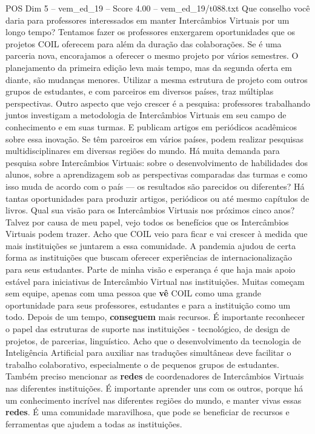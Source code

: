 \begin{textsample}{POS Dim 5 – vem\_ed\_19 – Score 4.00 – vem\_ed\_19/t088.txt}  \label{ex:f5_pos_131}
Que conselho você daria para professores interessados em manter Intercâmbios Virtuais por um longo tempo?
Tentamos fazer os professores enxergarem oportunidades que os projetos COIL oferecem para além da duração das colaborações.
Se é uma parceria nova, encorajamos a oferecer o mesmo projeto por vários semestres.
O planejamento da primeira edição leva mais tempo, mas da segunda oferta em diante, são mudanças menores.
Utilizar a mesma estrutura de projeto com outros grupos de estudantes, e com parceiros em diversos países, traz múltiplas perspectivas.
Outro aspecto que vejo crescer é a pesquisa: professores trabalhando juntos investigam a metodologia de Intercâmbios Virtuais em seu campo de conhecimento e em suas turmas.
E publicam artigos em periódicos acadêmicos sobre essa inovação.
Se têm parceiros em vários países, podem realizar pesquisas multidisciplinares em diversas regiões do mundo.
Há muita demanda para pesquisa sobre Intercâmbios Virtuais: sobre o desenvolvimento de habilidades dos alunos, sobre a aprendizagem sob as perspectivas comparadas das turmas e como isso muda de acordo com o país — os resultados são parecidos ou diferentes?
Há tantas oportunidades para produzir artigos, periódicos ou até mesmo capítulos de livros.
Qual sua visão para os Intercâmbios Virtuais nos próximos cinco anos?
Talvez por causa de meu papel, vejo todos os benefícios que os Intercâmbios Virtuais podem trazer.
Acho que COIL veio para ficar e vai crescer à medida que mais instituições se juntarem a essa comunidade.
A pandemia ajudou de certa forma as instituições que buscam oferecer experiências de internacionalização para seus estudantes.
Parte de minha visão e esperança é que haja mais apoio estável para iniciativas de Intercâmbio Virtual nas instituições.
Muitas começam sem equipe, apenas com uma pessoa que \textbf{vê} COIL como uma grande oportunidade para seus professores, estudantes e para a instituição como um todo.
Depois de um tempo, \textbf{conseguem} mais recursos.
É importante reconhecer o papel das estruturas de suporte nas instituições - tecnológico, de design de projetos, de parcerias, linguístico.
Acho que o desenvolvimento da tecnologia de Inteligência Artificial para auxiliar nas traduções simultâneas deve facilitar o trabalho colaborativo, especialmente o de pequenos grupos de estudantes.
Também preciso mencionar as \textbf{redes} de coordenadores de Intercâmbios Virtuais nas diferentes instituições.
É importante aprender uns com os outros, porque há um conhecimento incrível nas diferentes regiões do mundo, e manter vivas essas \textbf{redes}.
É uma comunidade maravilhosa, que pode se beneficiar de recursos e ferramentas que ajudem a todas as instituições.

\end{textsample}
